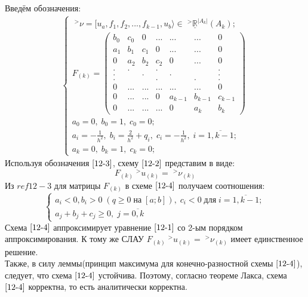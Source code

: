 \documentclass[__main__.tex]{subfiles}
\begin{document}
Введём обозначения:
\begin{gather}
\begin{cases}
\;^>\nu = [u_a,f_1,f_2,...,f_{k-1},u_b\rangle \in \;^>\underline{\mathbb{R}}^{|A_k|}(A_k);\\
F_{(k)}=
\begin{pmatrix}
b_0 & c_0 & 0 & ... & ... & ... & 0 \\
a_1 & b_1 & c_1 & 0 & ... & ... & 0\\
0 & a_2 & b_2 & c_2 & 0 & ... & 0\\
. & . & & . & & & .\\
. & & . & & . &  & .\\
. & & & . & & . & .\\
0 & ... & ... & ... & ... & ... & 0\\
0 & ... & ... & 0 & a_{k-1} & b_{k-1} & c_{k-1}\\
0 & ... & ... & ... & 0 & a_k & b_k
\end{pmatrix}\\
a_0=0, \; b_0=1, \; c_0=0;\\
a_i=-\frac{1}{h^2}, \; b_i=\frac{2}{h^2}+q_i, \; c_i=-\frac{1}{h^2},\; i=\overline{1,k-1};\\
a_k=0, \; b_k=1,\;c_k=0;
\end{cases}
\label{12-3}
\end{gather}
Используя обозначения $\ref{12-3}$, схему $\ref{12-2}$ представим в виде:\\
\begin{equation}
	F_{(k)}\;^>u_{(k)} = \;^>\nu_{(k)}
	\label{12-4}
\end{equation}
Из $ref{12-3}$ для матрицы $F_{(k)}$ в схеме $\ref{12-4}$ получаем соотношения:
\begin{equation}
	\begin{cases}
		a_i<0, b_i>0 \;(q\ge 0 \; \text{на} \; [a;b]), \; c_i < 0 \; \text{для} \; i=\overline{1,k-1};\\
		a_j+b_j+c_j \ge 0, \; j=\overline{0,k}
	\end{cases}
	\label{12-5}
\end{equation}
Схема $\ref{12-4}$ аппроксимирует уравнение $\ref{12-1}$ со 2-ым порядком аппроксимирования. К тому же СЛАУ $F_{(k)}\;^>u_{(k)} = \;^>\nu_{(k)}$ имеет единственное решение.\\
Также, в силу леммы(принцип максимума для конечно-разностной схемы $\ref{12-4}$), следует, что схема $\ref{12-4}$ устойчива. Поэтому, согласно теореме Лакса, схема $\ref*{12-4}$ корректна, то есть аналитически корректна.
\end{document}
